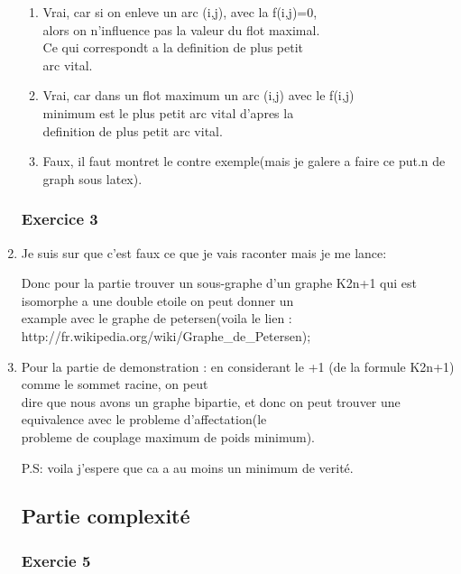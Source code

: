 \documentclass{article}
\begin{document}
\begin{enumerate}
\begin{enumerate}


\item Vrai, car si on enleve un arc (i,j), avec la f(i,j)=0,\\ alors on n'influence pas la valeur du flot maximal.\\
Ce qui correspondt a la definition de plus petit \\arc vital.

\item Vrai, car dans un flot maximum un arc (i,j) avec le f(i,j)\\ minimum est le plus petit arc vital d'apres la \\
definition de plus petit arc vital.
\item Faux, il faut montret le contre exemple(mais je galere a faire ce put.n de graph sous latex).

 
\end{enumerate}

\subsubsection{Exercice 3}


\item Je suis sur que c'est faux ce que je vais raconter mais je me lance:

Donc pour la partie trouver un sous-graphe d'un graphe K2n+1 qui est isomorphe a une double etoile on peut donner un\\
example avec le graphe de petersen(voila le lien : http://fr.wikipedia.org/wiki/Graphe_de_Petersen);

\item Pour la partie de demonstration : en considerant le +1 (de la formule K2n+1) comme le sommet racine, on peut \\
dire que nous avons un graphe bipartie, et donc on peut trouver une equivalence avec le probleme d'affectation(le \\
probleme de couplage maximum de poids minimum).



P.S: voila j'espere que ca a au moins un minimum de verité.


\subsection{Partie complexité}

\subsubsection{Exercie 5}


\end{enumerate}
\end{document}
